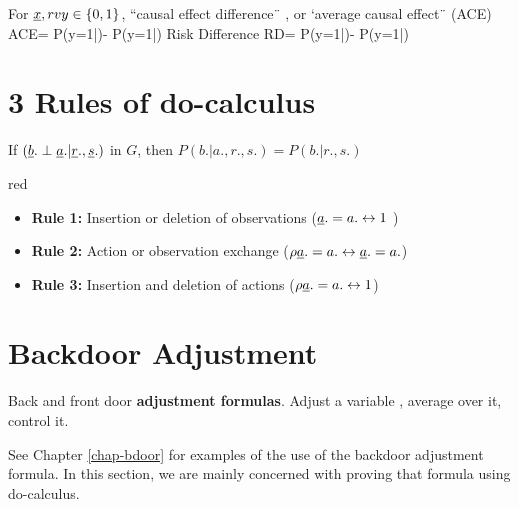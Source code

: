For ${\underline{x}}, rvy\in \{0,1\}$,
``causal effect difference¨ ,
or `average causal effect¨ (ACE)
\beq
ACE=
P(y=1|\rho {})-
P(y=1|\rho {})
\eeq
Risk Difference
\beq
RD=
P(y=1|)-
P(y=1|)
\eeq


\section*{3 Rules of do-calculus}

If $({\underline{b}}.\perp {\underline{a}}.|{\underline{r}}., {\underline{s}}.)$
in $G$, then $P(b.|a., r., s.)=P(b.|r., s.)$

\begin{color}{red}
\begin{itemize}
\item {\bf Rule 1:} 
Insertion or deletion of
 observations (${\underline{a}}.=a. \leftrightarrow 1$ )


\item {\bf Rule 2:} Action or 
observation exchange 
($\rho {\underline{a}}.=a. \leftrightarrow {\underline{a}}.=a.$)


\item {\bf Rule 3:} Insertion and
 deletion of actions
($\rho {\underline{a}}.=a. \leftrightarrow 1$)



\end{itemize}
\end{color}


\section*{Backdoor Adjustment}
Back and front
door {\bf adjustment formulas}.
Adjust a variable , average
over it, control it.

See Chapter \ref{chap-bdoor}
for examples of the use of the 
backdoor adjustment formula.
In this section,
we are mainly
concerned with
proving that
formula
using do-calculus.



